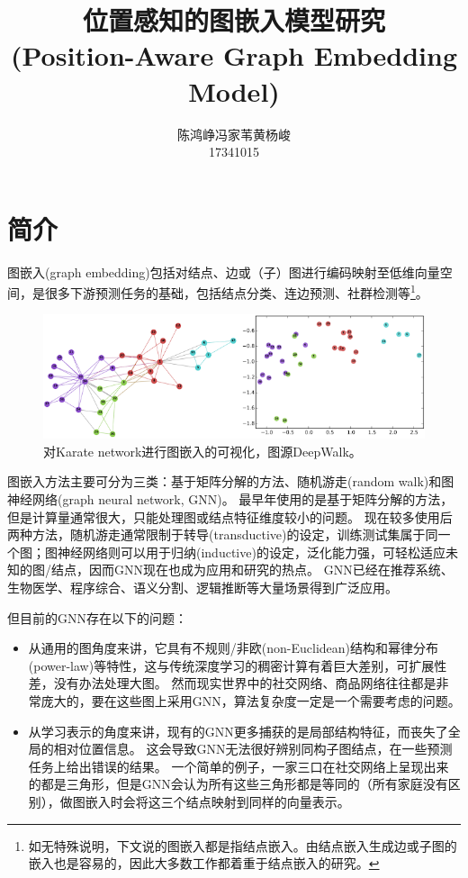 \documentclass[reportComp]{thesis}
\title{位置感知的图嵌入模型研究\\(Position-Aware Graph Embedding Model)}
\author{陈鸿峥\qquad 冯家苇\qquad 黄杨峻\\%
{\small 17341015\quad 17341035\quad 17341059}}
\begin{document}
\maketitle

\section{简介}
图嵌入(graph embedding)包括对结点、边或（子）图进行编码映射至低维向量空间，是很多下游预测任务的基础，包括结点分类、连边预测、社群检测等\footnote{如无特殊说明，下文说的图嵌入都是指结点嵌入。由结点嵌入生成边或子图的嵌入也是容易的，因此大多数工作都着重于结点嵌入的研究。}。
\begin{figure}[H]
\centering
\includegraphics[width=0.8\linewidth]{fig/graph_embedding_intro.png}
\caption{对Karate network进行图嵌入的可视化，图源DeepWalk\cite{perozzi:deepwalk_kdd_2014}。}
\end{figure}

图嵌入方法主要可分为三类：基于矩阵分解的方法、随机游走(random walk)和图神经网络(graph neural network, GNN)。
最早年使用的是基于矩阵分解的方法，但是计算量通常很大，只能处理图或结点特征维度较小的问题。
现在较多使用后两种方法，随机游走通常限制于转导(transductive)的设定，训练测试集属于同一个图；图神经网络则可以用于归纳(inductive)的设定，泛化能力强，可轻松适应未知的图/结点，因而GNN现在也成为应用和研究的热点。
GNN已经在推荐系统\cite{zhu:aligraph_vldb_2019}、生物医学、程序综合、语义分割、逻辑推断等大量场景得到广泛应用。

但目前的GNN存在以下的问题：
\begin{itemize}
\item 从通用的图角度来讲，它具有不规则/非欧(non-Euclidean)结构和幂律分布(power-law)等特性，这与传统深度学习的稠密计算有着巨大差别，可扩展性差，没有办法处理大图。
然而现实世界中的社交网络、商品网络往往都是非常庞大的，要在这些图上采用GNN，算法复杂度一定是一个需要考虑的问题。
\item 从学习表示的角度来讲，现有的GNN更多捕获的是局部结构特征，而丧失了全局的相对位置信息。
这会导致GNN无法很好辨别同构子图结点，在一些预测任务上给出错误的结果。
一个简单的例子，一家三口在社交网络上呈现出来的都是三角形，但是GNN会认为所有这些三角形都是等同的（所有家庭没有区别），做图嵌入时会将这三个结点映射到同样的向量表示。
\end{itemize}
\end{document}
